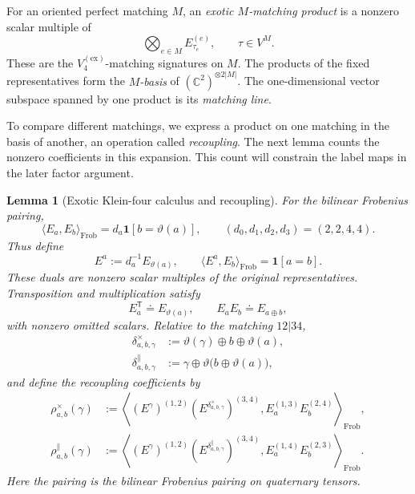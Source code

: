\documentclass[11pt,letterpaper,onecolumn]{article}
\theoremstyle{plain}
\newtheorem{lemma}[lemma]{Lemma}
\theoremstyle{definition}
\theoremstyle{remark}
\newcommand{\KleinEx}{{V_4^{(\mathrm{ex})}}}
\newcommand{\one}{\mathbf 1}
\begin{document}
For an oriented perfect matching \(M\), an \emph{exotic
\(M\)-matching product} is a nonzero scalar multiple of
\[
 \bigotimes_{e\in M}E_{\tau_e}^{(e)},
 \qquad \tau\in V^M.
\]
These are the \(\KleinEx\)-matching signatures on \(M\).
The products of the fixed representatives form the \emph{\(M\)-basis}
of \((\mathbb C^2)^{\otimes 2|M|}\). The one-dimensional vector subspace
spanned by one product is its \emph{matching line}.

To compare different matchings, we express a product on one matching in
the basis of another, an operation called \emph{recoupling}. The next
lemma counts the nonzero coefficients in this expansion. This count
will constrain the label maps in the later factor argument.

\begin{lemma}[Exotic Klein-four calculus and recoupling]
\label{lem:exotic-v4-calculus}
For the bilinear Frobenius pairing,
\begin{equation}
 \langle E_a,E_b\rangle_{\mathrm{Frob}}
 =d_a\one[b=\vartheta(a)],
 \qquad (d_0,d_1,d_2,d_3)=(2,2,4,4).
 \label{eq:exotic-v4-Gram}
\end{equation}
Thus define
\[
 E^a:=d_a^{-1}E_{\vartheta(a)},\qquad
 \langle E^a,E_b\rangle_{\mathrm{Frob}}=\one[a=b].
\]
These duals are nonzero scalar multiples of the original representatives.
Transposition and multiplication satisfy
\begin{equation}
 E_a^{\mathsf T}\doteq E_{\vartheta(a)},
 \qquad E_aE_b\doteq E_{a\oplus b},
 \label{eq:exotic-v4-transpose-fusion}
\end{equation}
with nonzero omitted scalars.  Relative to the matching \(12|34\),
\begin{align*}
 \delta^\times_{a,b,\gamma}
   &:=\vartheta(\gamma)\oplus b\oplus\vartheta(a),\\
 \delta^\parallel_{a,b,\gamma}
   &:=\gamma\oplus\vartheta\bigl(b\oplus\vartheta(a)\bigr),
\end{align*}
and define the recoupling coefficients by
\begin{align*}
 \rho^\times_{a,b}(\gamma)
   &:=
   \left\langle
    (E^\gamma)^{(1,2)}
    (E^{\delta^\times_{a,b,\gamma}})^{(3,4)},
    E_a^{(1,3)}E_b^{(2,4)}
   \right\rangle_{\mathrm{Frob}},\\
 \rho^\parallel_{a,b}(\gamma)
   &:=
   \left\langle
    (E^\gamma)^{(1,2)}
    (E^{\delta^\parallel_{a,b,\gamma}})^{(3,4)},
    E_a^{(1,4)}E_b^{(2,3)}
   \right\rangle_{\mathrm{Frob}} .
\end{align*}
Here the pairing is the bilinear Frobenius pairing on quaternary tensors.

\end{lemma}
\end{document}
